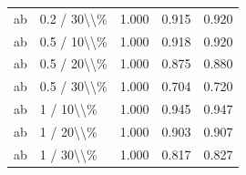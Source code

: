 \begin{table}[!h]
\begin{tabular}[t]{llccc}
\addlinespace
ab & 0.2 / 30\textbackslash{}\textbackslash{}\% & 1.000 & 0.915 & 0.920\\
ab & 0.5 / 10\textbackslash{}\textbackslash{}\% & 1.000 & 0.918 & 0.920\\
ab & 0.5 / 20\textbackslash{}\textbackslash{}\% & 1.000 & 0.875 & 0.880\\
ab & 0.5 / 30\textbackslash{}\textbackslash{}\% & 1.000 & 0.704 & 0.720\\
ab & 1 / 10\textbackslash{}\textbackslash{}\% & 1.000 & 0.945 & 0.947\\
\addlinespace
ab & 1 / 20\textbackslash{}\textbackslash{}\% & 1.000 & 0.903 & 0.907\\
ab & 1 / 30\textbackslash{}\textbackslash{}\% & 1.000 & 0.817 & 0.827\\
\bottomrule
\end{tabular}
\end{table}
